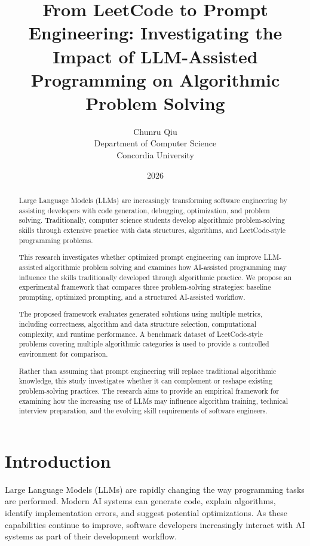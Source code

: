 \documentclass[11pt,a4paper]{article}
\title{
From LeetCode to Prompt Engineering:
Investigating the Impact of LLM-Assisted Programming on Algorithmic Problem Solving
}
\author{
Chunru Qiu\\
Department of Computer Science\\
Concordia University
}
\date{2026}
\begin{document}
\maketitle

\begin{abstract}

Large Language Models (LLMs) are increasingly transforming software engineering
by assisting developers with code generation, debugging, optimization, and
problem solving. Traditionally, computer science students develop algorithmic
problem-solving skills through extensive practice with data structures,
algorithms, and LeetCode-style programming problems.

This research investigates whether optimized prompt engineering can improve
LLM-assisted algorithmic problem solving and examines how AI-assisted
programming may influence the skills traditionally developed through
algorithmic practice. We propose an experimental framework that compares
three problem-solving strategies: baseline prompting, optimized prompting,
and a structured AI-assisted workflow.

The proposed framework evaluates generated solutions using multiple metrics,
including correctness, algorithm and data structure selection, computational
complexity, and runtime performance. A benchmark dataset of LeetCode-style
problems covering multiple algorithmic categories is used to provide a
controlled environment for comparison.

Rather than assuming that prompt engineering will replace traditional
algorithmic knowledge, this study investigates whether it can complement or
reshape existing problem-solving practices. The research aims to provide an
empirical framework for examining how the increasing use of LLMs may influence
algorithm training, technical interview preparation, and the evolving skill
requirements of software engineers.

\end{abstract}


\section{Introduction}

Large Language Models (LLMs) are rapidly changing the way programming tasks
are performed. Modern AI systems can generate code, explain algorithms,
identify implementation errors, and suggest potential optimizations. As these
capabilities continue to improve, software developers increasingly interact
with AI systems as part of their development workflow.
\end{document}
